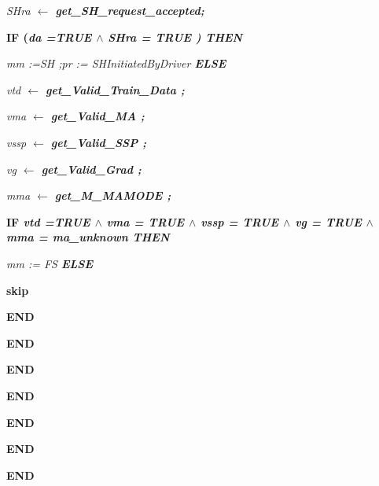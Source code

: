\documentclass[11pt]{article}
\begin{document}
\begin{sloppypar}
\hspace*{0.95in}\it SHra\hspace*{0.10in} $\leftarrow$  \bf get\_SH\_request\_accepted\rm ;

\hspace*{0.95in}\bf IF \rm (\it da \rm =\hspace*{0.10in}\bf TRUE  $\land$  \it SHra \rm = \bf TRUE \rm ) \hspace*{0.95in}\bf THEN

\hspace*{1.15in}\it mm \rm :=\hspace*{0.10in}\it SH \rm ;\hspace*{0.10in}\hspace*{1.15in}\it pr \rm := \it SHInitiatedByDriver \hspace*{0.95in}\bf ELSE\hspace*{0.15in}

\hspace*{1.15in}\hspace*{1.20in}\it vtd  $\leftarrow$  \bf get\_Valid\_Train\_Data \rm ;

\hspace*{1.20in}\it vma  $\leftarrow$  \bf get\_Valid\_MA \rm ;

\hspace*{1.20in}\it vssp  $\leftarrow$  \bf get\_Valid\_SSP \rm ;

\hspace*{1.20in}\it vg  $\leftarrow$  \bf get\_Valid\_Grad \rm ;

\hspace*{1.20in}\it mma  $\leftarrow$  \bf get\_M\_MAMODE \rm ;

\hspace*{1.20in}\bf IF \it vtd \rm =\hspace*{0.10in}\bf TRUE  $\land$  \it vma \rm = \bf TRUE  $\land$  \it vssp \rm = \bf TRUE  $\land$  \it vg \rm = \bf TRUE  $\land$  \it mma \rm = \it ma\_unknown \hspace*{1.20in}\bf THEN

\hspace*{1.40in}\it mm \rm := \it FS \hspace*{1.20in}\bf ELSE

\hspace*{1.40in}\hspace*{1.40in}\bf skip

\hspace*{1.20in}\bf END

\hspace*{1.00in}\bf END

\hspace*{0.80in}\bf END

\hspace*{0.60in}\bf END

\hspace*{0.40in}\bf END

\hspace*{0.20in}\bf END

\vspace*{8mm}
\bf END

\newpage
\end{sloppypar}
\end{document}
